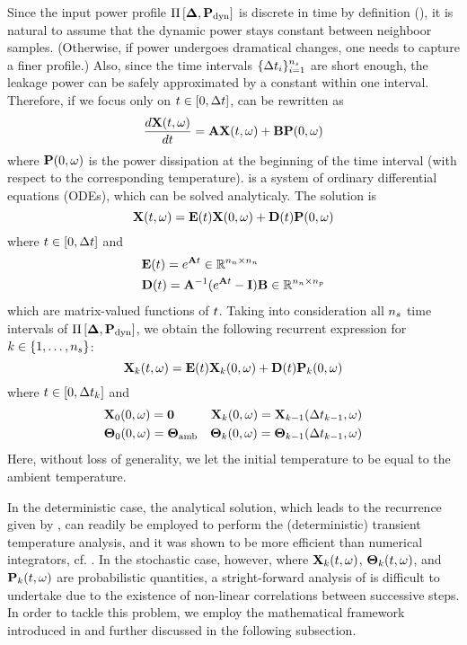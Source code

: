 Since the input power profile $\prof{\mP_\dyn}$ is discrete in time by definition (), it is natural to assume that the dynamic power stays constant between neighboor samples. (Otherwise, if power undergoes dramatical changes, one needs to capture a finer profile.) Also, since the time intervals $\{ \Delta t_i \}_{i = 1}^{{n_s}}$ are short enough, the leakage power can be safely approximated by a constant within one interval. Therefore, if we focus only on $t \in [0, \Delta t]$,  can be rewritten as
\begin{equation} \elabel{fourier-ode}
  \frac{d\vX(\t, \o)}{d\t} = \mA \vX(\t, \o) + \mB \vP(0, \o)
\end{equation}
where $\mathbf{P}(0, \omega)$ is the power dissipation at the beginning of the time interval (with respect to the corresponding temperature).  is a system of ordinary differential equations (ODEs), which can be solved analyticaly. The solution is
\begin{equation} \elabel{ode-solution}
  \vX(\t, \o) = \mE(\t) \vX(0, \o) + \mD(\t) \vP(0, \o)
\end{equation}
where $t \in [0, \Delta t]$ and
\begin{align}
  & \mE(\t) = e^{\mA \t} \in \real^{\nodes \times \nodes} \elabel{e} \\
  & \mD(\t) = \mA^{-1} (e^{\mA \t} - \mI) \mB \in \real^{\nodes \times \cores} \elabel{d}
\end{align}
which are matrix-valued functions of $t$. Taking into consideration all ${n_s}$ time intervals of $\prof{\mP_\dyn}$, we obtain the following recurrent expression for $k \in \{ 1, \dotsc, {n_s} \}$:
\begin{equation} \elabel{recurrence}
  \vX_k(\t, \o) = \mE(\t) \vX_k(0, \o) + \mD(\t) \vP_k(0, \o)
\end{equation}
where $t \in [ 0, \Delta t_k ]$ and
\begin{align*}
  & \mathbf{X}_0(0, \omega) = \mathbf{0} & \mathbf{X}_k(0, \omega) = \mathbf{X}_{k - 1}(\Delta t_{k - 1}, \omega) \\
  & {\boldsymbol\Theta}_0(0, \omega) = {\boldsymbol\Theta}_{\text{amb}} & {\boldsymbol\Theta}_k(0, \omega) = {\boldsymbol\Theta}_{k - 1}(\Delta t_{k - 1}, \omega)
\end{align*}
Here, without loss of generality, we let the initial temperature to be equal to the ambient temperature.

In the deterministic case, the analytical solution, which leads to the recurrence given by , can readily be employed to perform the (deterministic) transient temperature analysis, and it was shown to be more efficient than numerical integrators, cf. \cite{ukhov2012}. In the stochastic case, however, where $\mathbf{X}_k(t, \omega)$, ${\boldsymbol\Theta}_k(t, \omega)$, and $\mathbf{P}_k(t, \omega)$ are probabilistic quantities, a stright-forward analysis of  is difficult to undertake due to the existence of non-linear correlations between successive steps. In order to tackle this problem, we employ the mathematical framework introduced in  and further discussed in the following subsection.
